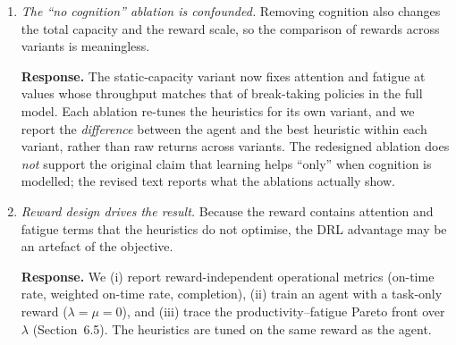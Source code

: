 \documentclass[11pt]{article}
\newcommand{\resp}[1]{\par\noindent\textbf{Response.} #1\par\medskip}
\begin{document}
\begin{enumerate}[label=R3.\arabic*]
\item \textit{The ``no cognition'' ablation is confounded.} Removing cognition also changes the total capacity and the reward scale, so the comparison of rewards across variants is meaningless.
\resp{The static-capacity variant now fixes attention and fatigue at values whose throughput matches that of break-taking policies in the full model. Each ablation re-tunes the heuristics for its own variant, and we report the \emph{difference} between the agent and the best heuristic within each variant, rather than raw returns across variants. The redesigned ablation does \emph{not} support the original claim that learning helps ``only'' when cognition is modelled; the revised text reports what the ablations actually show.}
\item \textit{Reward design drives the result.} Because the reward contains attention and fatigue terms that the heuristics do not optimise, the DRL advantage may be an artefact of the objective.
\resp{We (i) report reward-independent operational metrics (on-time rate, weighted on-time rate, completion), (ii) train an agent with a task-only reward ($\lambda=\mu=0$), and (iii) trace the productivity--fatigue Pareto front over $\lambda$ (Section~6.5). The heuristics are tuned on the same reward as the agent.}
\end{enumerate}
\end{document}
